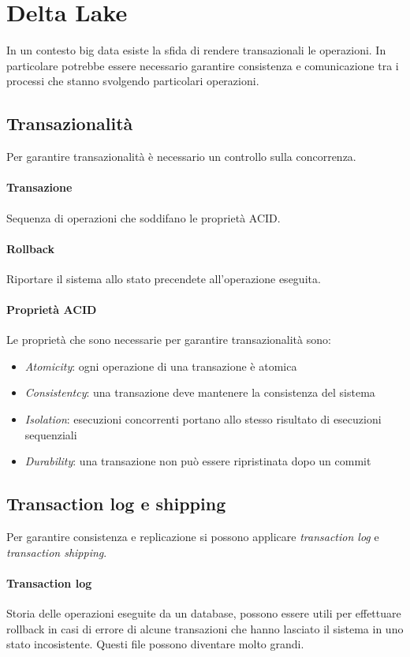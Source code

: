 \section{Delta Lake}
In un contesto big data esiste la sfida di rendere transazionali le operazioni.
In particolare potrebbe essere necessario garantire consistenza e comunicazione tra
i processi che stanno svolgendo particolari operazioni.

\subsection{Transazionalità}
Per garantire transazionalità è necessario un controllo sulla concorrenza.

\paragraph{Transazione}
Sequenza di operazioni che soddifano le proprietà ACID.

\paragraph{Rollback}
Riportare il sistema allo stato precendete all'operazione eseguita.

\paragraph{Proprietà ACID}
Le proprietà che sono necessarie per garantire transazionalità sono:
\begin{itemize}
    \item \emph{Atomicity}: ogni operazione di una transazione è atomica
    \item \emph{Consistentcy}: una transazione deve mantenere la consistenza del sistema
    \item \emph{Isolation}: esecuzioni concorrenti portano allo stesso risultato di esecuzioni sequenziali
    \item \emph{Durability}: una transazione non può essere ripristinata dopo un commit
\end{itemize}

\subsection{Transaction log e shipping}
Per garantire consistenza e replicazione si possono applicare \emph{transaction log} e
\emph{transaction shipping}.

\paragraph{Transaction log} 
Storia delle operazioni eseguite da un database, possono essere utili per effettuare
rollback in casi di errore di alcune transazioni che hanno lasciato
il sistema in uno stato incosistente. Questi file possono diventare molto grandi.

